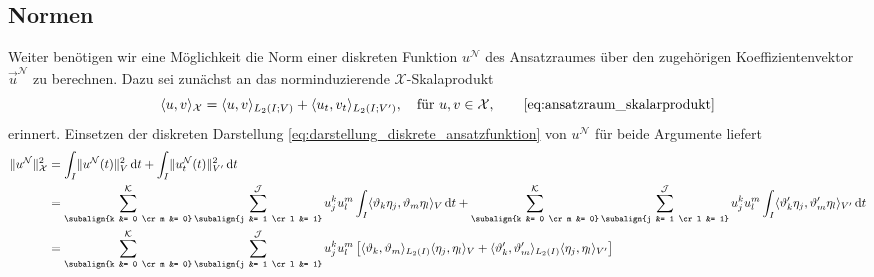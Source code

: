 \documentclass[../main.tex]{subfiles}
\begin{document}
\subsection*{Normen}

Weiter benötigen wir eine Möglichkeit die Norm einer diskreten Funktion $u^{\mathcal N}$ des Ansatzraumes über den zugehörigen Koeffizientenvektor $\vec{u}^{\mathcal N}$ zu berechnen.
Dazu sei zunächst an das norminduzierende $\mathcal X$-Skalaprodukt
\begin{equation}
    \skp{u}{v}{\mathcal X} = \skp{u}{v}{L_{2}(I; V)} + \skp{u_t}{v_t}{L_2(I; V')}, \quad \text{für } u, v \in \mathcal X, \tag*{\cref{eq:ansatzraum_skalarprodukt}}
\end{equation}
erinnert.
Einsetzen der diskreten Darstellung \cref{eq:darstellung_diskrete_ansatzfunktion} von $u^{\mathcal N}$ für beide Argumente liefert
\begin{align}
    \norm{u^{\mathcal N}}_{\mathcal X}^{2}
    &= \int_{I} \norm{u^{\mathcal N}(t)}^2_{V} \diff t
        + \int_{I} \norm{u^{\mathcal N}_{t}(t)}_{V'}^2 \diff t
    \\&= \sum_{\subalign{k &= 0 \cr m &= 0}}^{\mathcal K} \sum_{\subalign{j &= 1 \cr l &= 1}}^{\mathcal J} u^{k}_{j} u^{m}_{l} \int_{I} \skp{\theta_{k} \eta_{j}}{\theta_{m} \eta_{l}}{V} \diff t
        + \sum_{\subalign{k &= 0 \cr m &= 0}}^{\mathcal K} \sum_{\subalign{j &= 1 \cr l &= 1}}^{\mathcal J} u^{k}_{j} u^{m}_{l} \int_{I} \skp{\theta_{k}' \eta_{j}}{\theta_{m}' \eta_{l}}{V'} \diff t
    \\&= \sum_{\subalign{k &= 0 \cr m &= 0}}^{\mathcal K} \sum_{\subalign{j &= 1 \cr l &= 1}}^{\mathcal J} u^{k}_{j} u^{m}_{l} \left[ \skp{\theta_{k}}{\theta_{m}}{L_{2}(I)} \skp{\eta_{j}}{\eta_{l}}{V} + \skp{\theta_{k}'}{\theta_{m}'}{L_{2}(I)} \skp{\eta_{j}}{\eta_{l}}{V'} \right]
\end{align}
\end{document}
